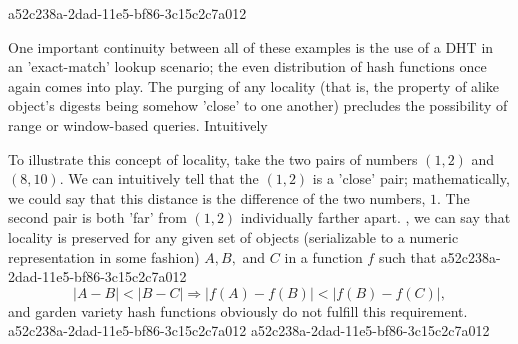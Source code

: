 \documentclass[12pt]{article}
\begin{document}
a52c238a-2dad-11e5-bf86-3c15c2c7a012\par One important continuity between all of these examples is the use of a DHT in an 'exact-match' lookup scenario; the even distribution of hash functions once again comes into play. The purging of any locality (that is, the property of alike object's digests being somehow 'close' to one another) precludes the possibility of range or window-based queries. Intuitively

\par To illustrate this concept of locality, take the two pairs of numbers $(1,2)$ and $(8,10)$. We can intuitively tell that the $(1,2)$ is a 'close' pair; mathematically, we could say that this distance is the difference of the two numbers, $1$. The second pair is both 'far' from $(1,2)$ individually farther apart. , we can say that locality is preserved for any given set of objects (serializable to a numeric representation in some fashion) $A,B,$ and $C$ in a function $f$ such that
a52c238a-2dad-11e5-bf86-3c15c2c7a012\begin{equation}
|A-B| < |B-C| \Rightarrow |f(A)-f(B)| < |f(B) - f(C)|,
\end{equation}
and garden variety hash functions obviously do not fulfill this requirement.
a52c238a-2dad-11e5-bf86-3c15c2c7a012
\printbibliography
a52c238a-2dad-11e5-bf86-3c15c2c7a012
\end{document}
